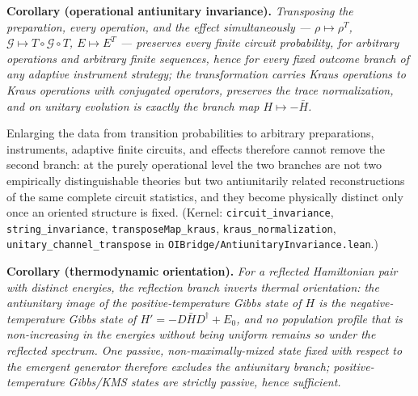 \documentclass[
]{article}
\begin{document}
\textbf{Corollary (operational antiunitary invariance).}
\emph{Transposing the preparation, every operation, and the effect
simultaneously --- \(\rho \mapsto \rho^T\),
\(\mathcal{G} \mapsto T \circ \mathcal{G} \circ T\), \(E \mapsto E^T\)
--- preserves every finite circuit probability, for arbitrary operations
and arbitrary finite sequences, hence for every fixed outcome branch of
any adaptive instrument strategy; the transformation carries Kraus
operations to Kraus operations with conjugated operators, preserves the
trace normalization, and on unitary evolution is exactly the branch map
\(H \mapsto -\bar{H}\).}

Enlarging the data from transition probabilities to arbitrary
preparations, instruments, adaptive finite circuits, and effects
therefore cannot remove the second branch: at the purely operational
level the two branches are not two empirically distinguishable theories
but two antiunitarily related reconstructions of the same complete
circuit statistics, and they become physically distinct only once an
oriented structure is fixed. (Kernel: \texttt{circuit\_invariance},
\texttt{string\_invariance}, \texttt{transposeMap\_kraus},
\texttt{kraus\_normalization}, \texttt{unitary\_channel\_transpose} in
\texttt{OIBridge/AntiunitaryInvariance.lean}.)

\textbf{Corollary (thermodynamic orientation).} \emph{For a reflected
Hamiltonian pair with distinct energies, the reflection branch inverts
thermal orientation: the antiunitary image of the positive-temperature
Gibbs state of \(H\) is the negative-temperature Gibbs state of
\(H' = -D\bar{H}D^\dagger + E_0\), and no population profile that is
non-increasing in the energies without being uniform remains so under
the reflected spectrum. One passive, non-maximally-mixed state fixed
with respect to the emergent generator therefore excludes the
antiunitary branch; positive-temperature Gibbs/KMS states are strictly
passive, hence sufficient.}
\end{document}

